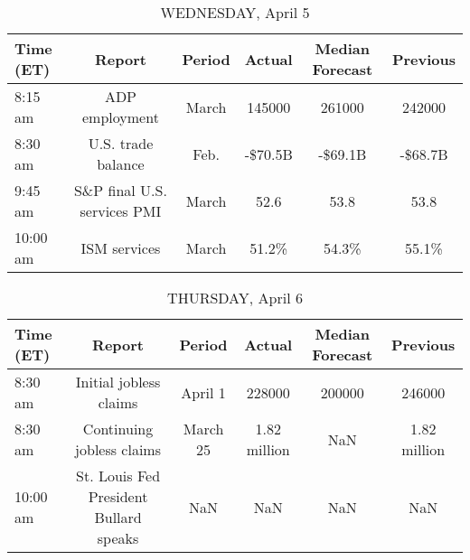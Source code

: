 \documentclass{article}%
\begin{document}
\begin{table}[htbp]%
\caption{WEDNESDAY, April 5}%
\centering%
\begin{adjustbox}{width=1\textwidth}%
\begin{tabular}{lccccc}
\toprule
Time (ET) &                      Report & Period &  Actual & Median Forecast & Previous \\
\midrule
  8:15 am &              ADP employment &  March &  145000 &          261000 &   242000 \\
  8:30 am &          U.S. trade balance &   Feb. & -\$70.5B &         -\$69.1B &  -\$68.7B \\
  9:45 am & S\&P final U.S. services PMI &  March &    52.6 &            53.8 &     53.8 \\
 10:00 am &                ISM services &  March &   51.2\% &           54.3\% &    55.1\% \\
\bottomrule
\end{tabular}
%
\end{adjustbox}%
\end{table}

%


\begin{table}[htbp]%
\caption{THURSDAY, April 6}%
\centering%
\begin{adjustbox}{width=1\textwidth}%
\begin{tabular}{lccccc}
\toprule
Time (ET) &                                 Report &   Period &       Actual & Median Forecast &     Previous \\
\midrule
  8:30 am &                 Initial jobless claims &  April 1 &       228000 &          200000 &       246000 \\
  8:30 am &              Continuing jobless claims & March 25 & 1.82 million &             NaN & 1.82 million \\
 10:00 am & St. Louis Fed President Bullard speaks &      NaN &          NaN &             NaN &          NaN \\
\bottomrule
\end{tabular}
%
\end{adjustbox}%
\end{table}

%
\end{document}
